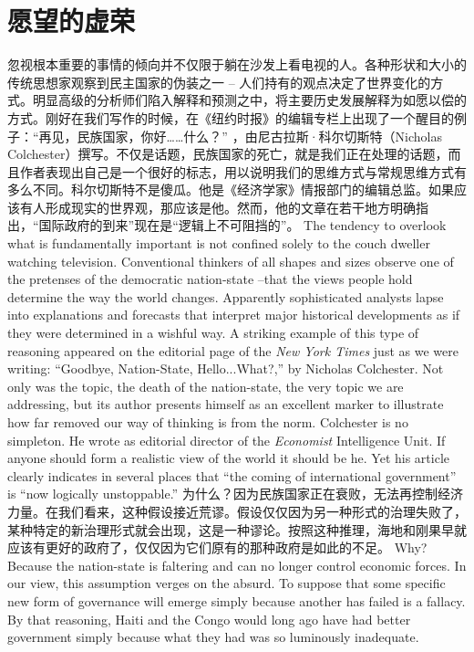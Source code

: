 \section{愿望的虚荣}
\begin{paracol}{2}
忽视根本重要的事情的倾向并不仅限于躺在沙发上看电视的人。各种形状和大小的传统思想家观察到民主国家的伪装之一 -- 人们持有的观点决定了世界变化的方式。明显高级的分析师们陷入解释和预测之中，将主要历史发展解释为如愿以偿的方式。刚好在我们写作的时候，在《纽约时报》的编辑专栏上出现了一个醒目的例子：“再见，民族国家，你好……什么？” ，由尼古拉斯·科尔切斯特（Nicholas Colchester）撰写。不仅是话题，民族国家的死亡，就是我们正在处理的话题，而且作者表现出自己是一个很好的标志，用以说明我们的思维方式与常规思维方式有多么不同。科尔切斯特不是傻瓜。他是《经济学家》情报部门的编辑总监。如果应该有人形成现实的世界观，那应该是他。然而，他的文章在若干地方明确指出，“国际政府的到来”现在是“逻辑上不可阻挡的”。
\switchcolumn
The tendency to overlook what is fundamentally important is not confined solely to the couch dweller watching television. Conventional thinkers of all shapes and sizes observe one of the pretenses of the democratic nation-state --that the views people hold determine the way the world changes. Apparently sophisticated analysts lapse into explanations and forecasts that interpret major historical developments as if they were determined in a wishful way. A striking example of this type of reasoning appeared on the editorial page of the \emph{New York Times} just as we were writing: ``Goodbye, Nation-State, Hello...What?,'' by Nicholas Colchester. Not only was the topic, the death of the nation-state, the very topic we are addressing, but its author presents himself as an excellent marker to illustrate how far removed our way of thinking is from the norm. Colchester is no simpleton. He wrote as editorial director of the \emph{Economist} Intelligence Unit. If anyone should form a realistic view of the world it should be he. Yet his article clearly indicates in several places that ``the coming of international government'' is ``now logically unstoppable.''
\switchcolumn*
为什么？因为民族国家正在衰败，无法再控制经济力量。在我们看来，这种假设接近荒谬。假设仅仅因为另一种形式的治理失败了，某种特定的新治理形式就会出现，这是一种谬论。按照这种推理，海地和刚果早就应该有更好的政府了，仅仅因为它们原有的那种政府是如此的不足。
\switchcolumn
Why? Because the nation-state is faltering and can no longer control economic forces.  In our view, this assumption verges on the absurd. To suppose that some specific new form of governance will emerge simply because another has failed is a fallacy. By that reasoning, Haiti and the Congo would long ago have had better government simply because what they had was so luminously inadequate.

\end{paracol}
